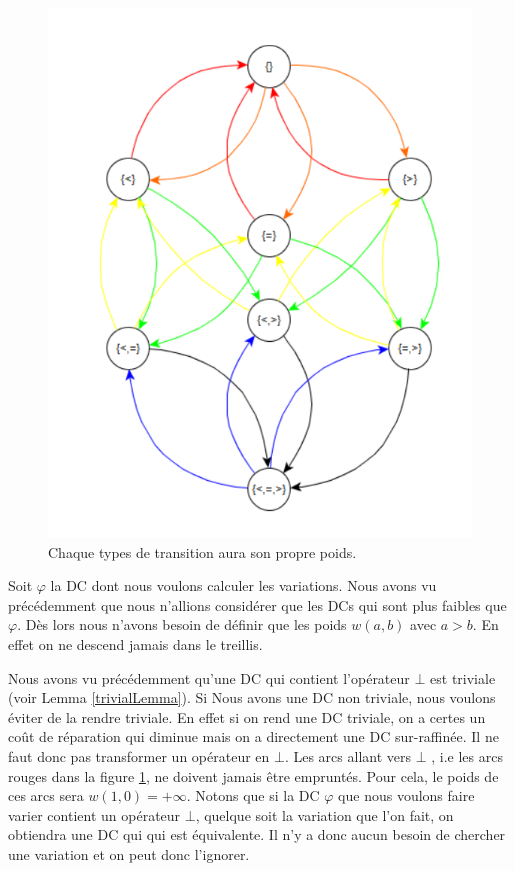 \documentclass[letterpaper, 12pt]{report}
\theoremstyle{definition}
\begin{document}
\begin{figure}
	\centering
	\includegraphics[scale=0.655]{img/treillisGraph}
	\caption{\label{treillisGraph} Chaque types de transition aura son propre poids.}
\end{figure}

Soit $\varphi$ la DC dont nous voulons calculer les variations. Nous avons vu précédemment que nous n'allions considérer que les DCs qui sont plus faibles que $\varphi$. Dès lors nous n'avons besoin de définir que les poids $w(a,b)$ avec $a > b$. En effet on ne descend jamais dans le treillis.

Nous avons vu précédemment qu'une DC qui contient l'opérateur $\bot$ est triviale (voir Lemma \ref{trivialLemma}). Si Nous avons une DC non triviale, nous voulons éviter de la rendre triviale. En effet si on rend une DC triviale, on a certes un coût de réparation qui diminue mais on a directement une DC sur-raffinée. Il ne faut donc pas transformer un opérateur en $\bot$. Les arcs allant vers $\bot$ , i.e les arcs rouges dans la figure \ref{treillisGraph}, ne doivent jamais être empruntés. Pour cela, le poids de ces arcs sera $w(1,0)= + \infty$. Notons que si la DC $\varphi$ que nous voulons faire varier contient un opérateur $\bot$, quelque soit la variation que l'on fait, on obtiendra une DC qui qui est équivalente. Il n'y a donc aucun besoin de chercher une variation et on peut donc l'ignorer.\\
\end{document}

